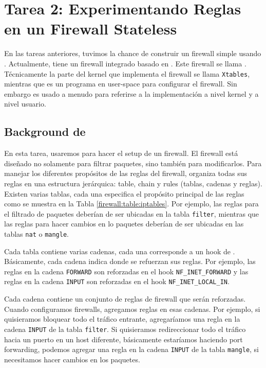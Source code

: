 \section{Tarea 2: Experimentando Reglas en un Firewall Stateless}

En las tareas anteriores, tuvimos la chance de construir un firewall simple usando \netfilter. Actualmente, \linux tiene un firewall integrado basado en \netfilter. Este firewall se llama \iptables. Técnicamente la parte del kernel que implementa el firewall se llama  \texttt{Xtables}, mientras que \iptables es un programa en user-space para configurar el firewall. Sin embargo \iptables es usado a menudo para referirse a la implementación a nivel kernel y a nivel usuario.



\subsection{Background de \iptables}

En esta tarea, usaremos \iptables para hacer el setup de un firewall.
El firewall \iptables está diseñado no solamente para filtrar paquetes, sino también para modificarlos. Para manejar los diferentes propósitos de las reglas del firewall, \iptables organiza todas sus reglas en una estructura jerárquica: table, chain y rules (tablas, cadenas y reglas).
Existen varias tablas, cada una especifica el propósito principal de las reglas como se muestra en la Tabla \ref{firewall:table:iptables}.
Por ejemplo, las reglas para el filtrado de paquetes deberían de ser ubicadas en la tabla \texttt{filter}, mientras que las reglas para hacer cambios en lo paquetes deberían de ser ubicadas en las tablas \texttt{nat} o \texttt{mangle}.

Cada tabla contiene varias cadenas, cada una corresponde a un hook de \netfilter. Básicamente, cada cadena indica donde se refuerzan sus reglas. Por ejemplo, las reglas en la cadena \texttt{FORWARD} son reforzadas en el hook \texttt{NF\_INET\_FORWARD} y las reglas en la cadena \texttt{INPUT} son reforzadas en el hook \texttt{NF\_INET\_LOCAL\_IN}.

Cada cadena contiene un conjunto de reglas de firewall que serán reforzadas.
Cuando configuramos firewalls, agregamos reglas en esas cadenas.
Por ejemplo, si quisieramos bloquear todo el tráfico \telnet entrante, agregaríamos una regla en la cadena \texttt{INPUT} de la tabla \texttt{filter}. Si quisieramos redireccionar todo el tráfico \telnet hacia un puerto  en un host diferente, básicamente estaríamos haciendo port forwarding, podemos agregar una regla en la cadena \texttt{INPUT} de la tabla \texttt{mangle}, si necesitamos hacer cambios en los paquetes.


